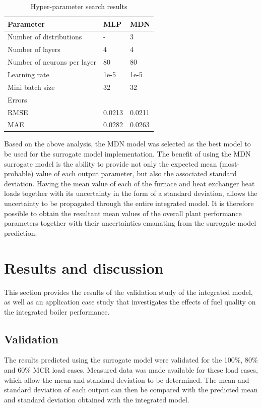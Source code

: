 \documentclass[a4paper,fleqn]{cas-sc}
\begin{document}
\begin{table}[h!]
\caption{Hyper-parameter search results}\label{tbl_hyper_results}
\begin{tabular*}{\tblwidth}{p{}p{}p{}}
\toprule
 Parameter& MLP & MDN \\ %
\midrule
 Number of distributions & - & 3  \\
 Number of layers & 4 & 4\\
 Number of neurons per layer & 80  & 80\\
 Learning rate & 1e-5 &  1e-5   \\
 Mini batch size  &32 & 32  \\
\midrule
Errors & &\\
\midrule
RMSE & 0.0213 & 0.0211\\
MAE & 0.0282& 0.0263\\
\bottomrule
\end{tabular*}
\end{table}  

Based on the above analysis, the MDN model was selected as the best model to be used for the surrogate model implementation. The benefit of using the MDN surrogate model is the ability to provide not only the expected mean (most-probable) value of each output parameter, but also the associated standard deviation. Having the mean value of each of the furnace and heat exchanger heat loads together with its uncertainty in the form of a standard deviation, allows the uncertainty to be propagated through the entire integrated model. It is therefore possible to obtain the resultant mean values of the overall plant performance parameters together with their uncertainties emanating from the surrogate model prediction.

\section{Results and discussion}\label{sec_results_diss}
This section provides the results of the validation study of the integrated model, as well as an application case study that investigates the effects of fuel quality on the integrated boiler performance. 

\subsection{Validation}\label{sec_result_1}
The results predicted using the surrogate model were validated for the 100\%, 80\% and 60\% MCR load cases. Measured data was made available for these load cases, which allow the mean and standard deviation to be determined.  The mean and standard deviation of each output can then be compared with the predicted mean and standard deviation obtained with the integrated model.\\
\end{document}
